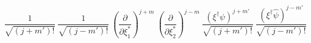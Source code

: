 \begin{equation}
\frac{1}{\sqrt{(j+m')!}}~\frac{1}{\sqrt{(j-m')!}}~ (\frac{\partial}{\partial \xi_1^*})^{j+m}~(\frac{\partial}{\partial \xi_2^*})^{j-m}~ \frac{(\xi^\dag \psi)^{j+m'}}{\sqrt{(j+m')!}}~\frac{(\xi^\dag \hat{\psi})^{j-m'}}{\sqrt{(j-m')!}}  
\end{equation}

